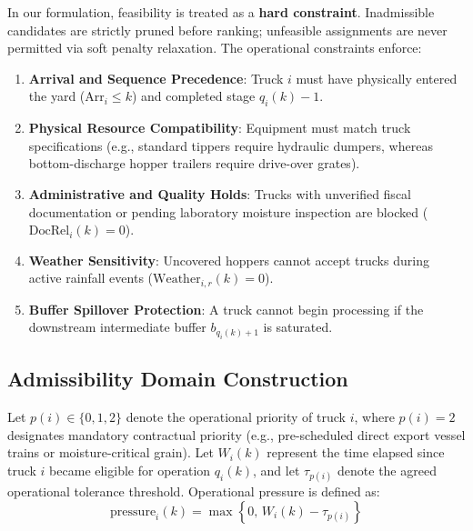 \documentclass[11pt,a4paper]{article}
\begin{document}
In our formulation, feasibility is treated as a \textbf{hard constraint}. Inadmissible candidates are strictly pruned before ranking; unfeasible assignments are never permitted via soft penalty relaxation. The operational constraints enforce:
\begin{enumerate}[leftmargin=1.2cm,itemsep=0pt,topsep=2pt]
  \item \textbf{Arrival and Sequence Precedence}: Truck $i$ must have physically entered the yard ($\mathrm{Arr}_i \le k$) and completed stage $q_i(k)-1$.
  \item \textbf{Physical Resource Compatibility}: Equipment must match truck specifications (e.g., standard tippers require hydraulic dumpers, whereas bottom-discharge hopper trailers require drive-over grates).
  \item \textbf{Administrative and Quality Holds}: Trucks with unverified fiscal documentation or pending laboratory moisture inspection are blocked ($\mathrm{DocRel}_i(k) = 0$).
  \item \textbf{Weather Sensitivity}: Uncovered hoppers cannot accept trucks during active rainfall events ($\mathrm{Weather}_{i,r}(k) = 0$).
  \item \textbf{Buffer Spillover Protection}: A truck cannot begin processing if the downstream intermediate buffer $b_{q_i(k)+1}$ is saturated.
\end{enumerate}

\subsection{Admissibility Domain Construction}
Let $p(i) \in \{0, 1, 2\}$ denote the operational priority of truck $i$, where $p(i)=2$ designates mandatory contractual priority (e.g., pre-scheduled direct export vessel trains or moisture-critical grain). Let $W_i(k)$ represent the time elapsed since truck $i$ became eligible for operation $q_i(k)$, and let $\tau_{p(i)}$ denote the agreed operational tolerance threshold. Operational pressure is defined as:
\begin{equation}
  \mathrm{pressure}_i(k) = \max\left\{ 0,\, W_i(k) - \tau_{p(i)} \right\}
\end{equation}
\end{document}
